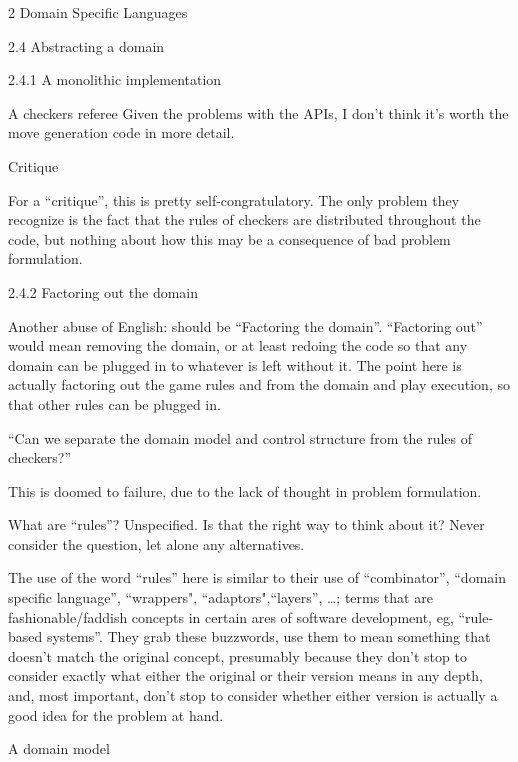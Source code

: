 \documentclass[12pt]{PalisadesLakesBook}
\begin{document}
\begin{plSection}{2 Domain Specific Languages}
\begin{plSection}{2.4 Abstracting a domain}
\begin{plSection}{2.4.1 A monolithic implementation}
\begin{plSection}{A checkers referee}
Given the problems with the APIs, I don't think it's worth
the move generation code in more detail.

\end{plSection}%
\begin{plSection}{Critique}

For a ``critique'', this is pretty self-congratulatory.
The only problem they recognize is the fact that the rules
of checkers are distributed throughout the code,
but nothing about how this may be a consequence 
of bad problem formulation.

\end{plSection}%
\end{plSection}%
\begin{plSection}{2.4.2 Factoring out the domain}
\label{sec:FactoringCheckers}

Another abuse of English: should be ``Factoring the domain''.
``Factoring out'' would mean removing the domain,
or at least redoing the code so that any domain can be plugged in
to whatever is left without it.
The point here is actually factoring out the game rules and 
from the domain and play execution, so that other rules can
be plugged in.

``Can we separate the domain model and control structure
from the rules of checkers?''

This is doomed to failure, due to the lack of thought
in problem formulation.

What are ``rules''? 
Unspecified.
Is that the right way to think about it? 
Never consider the question, let alone any alternatives.

The use of the word ``rules'' here is similar
to their use of ``combinator'', ``domain specific language'',
``wrappers", ``adaptors",``layers'', {\ldots};
terms that are fashionable/faddish concepts in certain
ares of software development, eg, ``rule-based systems''.
They grab these buzzwords, use them to mean something that
doesn't match the original concept, presumably because they
don't stop to consider exactly what either the original 
or their version means in any depth, and, most important,
don't stop to consider whether either version is actually a good
idea for the problem at hand. 


\begin{plSection}{A domain model}


\end{plSection}
\end{plSection}
\end{plSection}
\end{plSection}
\end{document}
